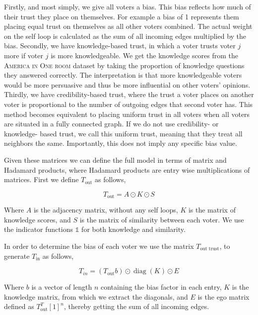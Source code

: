 Firstly, and most simply, we give all voters a bias. This bias reflects how
much of their trust they place on themselves. For example a bias of 1
represents them placing equal trust on themselves as all other voters combined.
The actual weight on the self loop is calculated as the sum of all incoming
edges multiplied by the bias. Secondly, we have knowledge-based trust, in which
a voter trusts voter $j$ more if voter $j$ is more knowledgeable. We get the
knowledge scores from the \textsc{America in One room} dataset by taking the
proportion of knowledge questions they answered correctly. The interpretation
is that more knowledgeable voters would be more persuasive and thus be more
influential on other voters' opinions. Thirdly, we have credibility-based
trust, where the trust a voter places on another voter is proportional to the
number of outgoing edges that second voter has. This method becomes equivalent
to placing uniform trust in all voters when all voters are situated in a fully
connected graph. If we do not use credibility- or knowledge- based trust, we
call this uniform trust, meaning that they treat all neighbors the same.
Importantly, this does not imply any specific bias value.

Given these matrices we can define the full model in terms of matrix and
Hadamard products, where Hadamard products are entry wise multiplications of
matrices. First we define $T_{\text{out}}$ as follows,

\begin{equation}
	T_{\text{out}} = A \odot  K \odot S
	\label{eq:mat_out_trust}
\end{equation}

Where $A$ is the adjacency matrix, without any self loops, $K$ is the matrix of knowledge scores, and $S$ is the matrix of similarity between each voter. We use the indicator functions $\mathds{1}$ for both knowledge and similarity.

In order to determine the bias of each voter we use the matrix $T_{\text{out trust}}$, to generate $T_{\text{in}}$ as follows,

\begin{equation}
	T_{in} = (T_{\text{out}} b) \odot \operatorname{diag}(K) \odot E
	\label{eq:in_trust}
\end{equation}

Where $b$ is a vector of length $n$ containing the bias factor in each entry,
$K$ is the knowledge matrix, from which we extract the diagonals, and $E$ is
the ego matrix defined as $T_{\text{out}}^T [1]^n$, thereby getting the sum of
all incoming edges.

